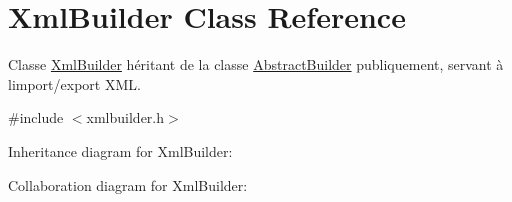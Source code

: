 \hypertarget{class_xml_builder}{}\section{Xml\+Builder Class Reference}
\label{class_xml_builder}


Classe \hyperlink{class_xml_builder}{Xml\+Builder} héritant de la classe \hyperlink{class_abstract_builder}{Abstract\+Builder} publiquement, servant à l\textquotesingle{}import/export X\+M\+L.  




{\ttfamily \#include $<$xmlbuilder.\+h$>$}



Inheritance diagram for Xml\+Builder\+:


Collaboration diagram for Xml\+Builder\+:
